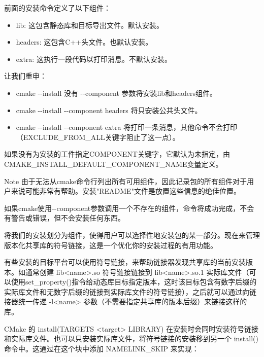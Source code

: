 前面的安装命令定义了以下组件：

\begin{itemize}
\item
lib: 这包含静态库和目标导出文件。默认安装。

\item
headers: 这包含C++头文件。也默认安装。

\item
extra: 这执行一段代码以打印消息。不默认安装。
\end{itemize}

让我们重申：

\begin{itemize}
\item
cmake -{}-install 没有 -{}-component 参数将安装lib和headers组件。

\item
cmake -{}-install -{}-component headers 将只安装公共头文件。

\item
cmake -{}-install -{}-component extra 将打印一条消息，其他命令不会打印（EXCLUDE\_FROM\_ALL关键字阻止了这一点）。
\end{itemize}

如果没有为安装的工件指定COMPONENT关键字，它默认为未指定，由CMAKE\_INSTALL\_DEFAULT\_COMPONENT\_NAME变量定义。

\begin{myNotic}{Note}
由于无法从cmake命令行列出所有可用组件，因此记录包的所有组件对于用户来说可能非常有帮助。安装"README"文件是放置这些信息的绝佳位置。
\end{myNotic}

如果cmake使用-{}-component参数调用一个不存在的组件，命令将成功完成，不会有警告或错误，但不会安装任何东西。

将我们的安装划分为组件，使得用户可以选择性地安装包的某一部分。现在来管理版本化共享库的符号链接，这是一个优化你的安装过程的有用功能。


有些安装的目标平台可以使用符号链接，来帮助链接器发现共享库的当前安装版本。如通常创建 lib<name>.so 符号链接链接到 lib<name>.so.1 实际库文件（可以使用set\_property()指令给动态库目标指定版本，这时该目标包含有数字后缀的实际库文件和无数字后缀的链接到实际库文件的符号链接），之后就可以通过向链接器统一传递 -l<name> 参数（不需要指定共享库的版本后缀）来链接这样的库。

CMake 的 install(TARGETS <target> LIBRARY) 在安装时会同时安装符号链接和实际库文件。也可以只安装实际库文件，将符号链接的安装移到另一个 install() 命令中。这通过在这个块中添加 NAMELINK\_SKIP 来实现：

